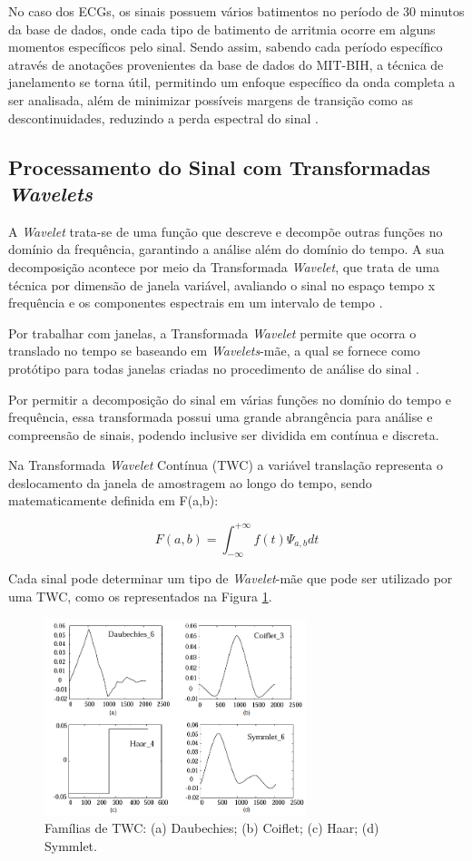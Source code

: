 \documentclass[conference]{IEEEtran}
\begin{document}
No caso dos ECGs, os sinais possuem vários batimentos no período de 30 minutos da base de dados, onde cada tipo de batimento de arritmia ocorre em alguns momentos específicos pelo sinal. Sendo assim, sabendo cada período específico através de anotações provenientes da base de dados do MIT-BIH, a técnica de janelamento se torna útil, permitindo um enfoque específico da onda completa a ser analisada, além de minimizar possíveis margens de transição como as descontinuidades, reduzindo a perda espectral do sinal \cite{ni16}.

\subsection{Processamento do Sinal com Transformadas \textit{Wavelets}}
A \textit{Wavelet} trata-se de uma função que descreve e decompõe outras funções no domínio da frequência, garantindo a análise além do domínio do tempo. A sua decomposição acontece por meio da Transformada \textit{Wavelet}, que trata de uma técnica por dimensão de janela variável, avaliando o sinal no espaço tempo x frequência e os componentes espectrais em um intervalo de tempo \cite{graps95}.

Por trabalhar com janelas, a Transformada \textit{Wavelet} permite que ocorra o translado no tempo se baseando em \textit{Wavelets}-mãe, a qual se fornece como protótipo para todas janelas criadas no procedimento de análise do sinal \cite{graps95}.

Por permitir a decomposição do sinal em várias funções no domínio do tempo e frequência, essa transformada possui uma grande abrangência para análise e compreensão de sinais, podendo inclusive ser dividida em contínua e discreta.

Na Transformada \textit{Wavelet} Contínua (TWC) a variável translação representa o deslocamento da janela de amostragem ao longo do tempo, sendo matematicamente definida em F(a,b):

\[ 	F(a,b) = \int^{+\infty}_{-\infty} f(t)\Psi_{a,b} dt \]

Cada sinal pode determinar um tipo de \textit{Wavelet}-mãe que pode ser utilizado por uma TWC, como os representados na Figura \ref{waveletContinuaFamilias}.

\begin{figure}[!h]
	\centering
	\includegraphics[width=3in]{img/waveletContinuaFamilias}
	\caption{Famílias de TWC: (a) Daubechies; (b) Coiflet; (c) Haar; (d) Symmlet.}
	\label{waveletContinuaFamilias}
\end{figure}
\end{document}
